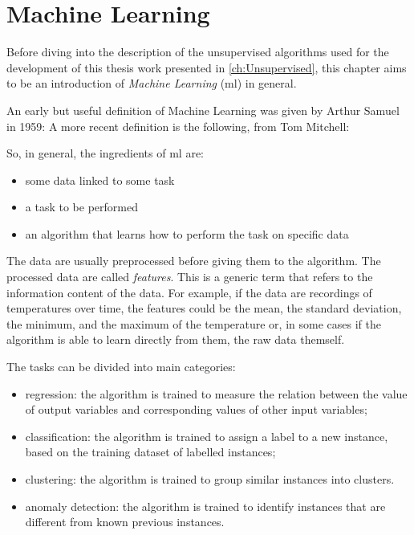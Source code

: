 \chapter{Machine Learning}
\label{ch:MachineLearning}

Before diving into the description of the unsupervised algorithms used for the development of this thesis work presented in \autoref{ch:Unsupervised}, this chapter aims to be an introduction of \emph{Machine Learning} (\gls{ml}) in general.

An early but useful definition of Machine Learning was given by Arthur Samuel in 1959:  A more recent definition is the following, from Tom Mitchell:  

So, in general, the ingredients of \gls{ml} are:
\begin{itemize}
    \item some data linked to some task
    \item a task to be performed
    \item an algorithm that learns how to perform the task on specific data
\end{itemize}

The data are usually preprocessed before giving them to the algorithm. The processed data are called \emph{features}. This is a generic term that refers to the information content of the data.
For example, if the data are recordings of temperatures over time, the features could be the mean, the standard deviation, the minimum, and the maximum of the temperature or, in some cases if the algorithm is able to learn directly from them, the raw data themself.

The tasks can be divided into main categories:
\begin{itemize}
    \item regression: the algorithm is trained to measure the relation between the value of output variables and corresponding values of other input variables;
    \item classification: the algorithm is trained to assign a label to a new instance, based on the training dataset of labelled instances;
    \item clustering: the algorithm is trained to group similar instances into clusters.
    \item anomaly detection: the algorithm is trained to identify instances that are different from known previous instances.
\end{itemize}

